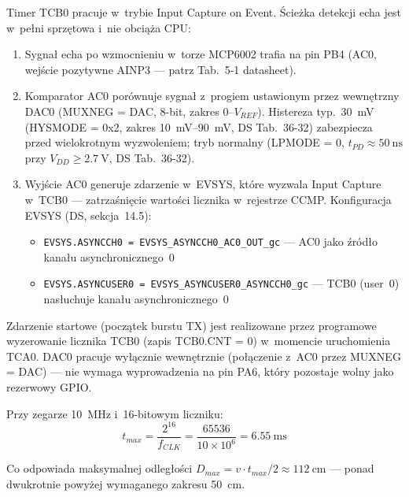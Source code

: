 \documentclass[a4paper,11pt]{article}
\begin{document}
Timer TCB0 pracuje w~trybie Input Capture on Event. Ścieżka detekcji
echa jest w~pełni sprzętowa i~nie obciąża CPU:

\begin{enumerate}[nosep]
    \item Sygnał echa po wzmocnieniu w~torze MCP6002 trafia
          na pin PB4 (AC0, wejście pozytywne AINP3 --- patrz Tab.~5-1 datasheet).
    \item Komparator AC0 porównuje sygnał z~progiem ustawionym przez
          wewnętrzny DAC0 (MUXNEG = DAC, 8-bit, zakres 0--$V_{REF}$).
          Histereza typ.\ \SI{30}{\milli\volt} (HYSMODE = 0x2,
          zakres \SIrange{10}{90}{\milli\volt}, DS Tab.~36-32) zabezpiecza
          przed wielokrotnym wyzwoleniem; tryb normalny (LPMODE = 0,
          $t_{PD} \approx \SI{50}{\nano\second}$ przy $V_{DD} \geq \SI{2,7}{\volt}$,
          DS Tab.~36-32).
    \item Wyjście AC0 generuje zdarzenie w~EVSYS, które
          wyzwala Input Capture w~TCB0 --- zatrzaśnięcie wartości licznika
          w~rejestrze CCMP. Konfiguracja EVSYS (DS, sekcja~14.5):
          \begin{itemize}[nosep]
              \item \texttt{EVSYS.ASYNCCH0 = EVSYS\_ASYNCCH0\_AC0\_OUT\_gc}
                    --- AC0 jako źródło kanału asynchronicznego~0
              \item \texttt{EVSYS.ASYNCUSER0 = EVSYS\_ASYNCUSER0\_ASYNCCH0\_gc}
                    --- TCB0 (user~0) nasłuchuje kanału asynchronicznego~0
          \end{itemize}
\end{enumerate}

Zdarzenie startowe (początek burstu TX) jest realizowane przez programowe
wyzerowanie licznika TCB0 (zapis TCB0.CNT = 0) w~momencie uruchomienia
TCA0. DAC0 pracuje wyłącznie wewnętrznie (połączenie z~AC0 przez
MUXNEG = DAC) --- nie wymaga wyprowadzenia na pin PA6, który pozostaje
wolny jako rezerwowy GPIO.

Przy zegarze \SI{10}{\mega\hertz} i~16-bitowym liczniku:
\begin{equation}
    t_{max} = \frac{2^{16}}{f_{CLK}} = \frac{65536}{10 \times 10^6} = \SI{6,55}{\milli\second}
    \label{eq:tcb_max}
\end{equation}

Co odpowiada maksymalnej odległości $D_{max} = v \cdot t_{max} / 2 \approx
\SI{112}{\centi\metre}$ --- ponad dwukrotnie powyżej wymaganego zakresu \SI{50}{\centi\metre}.
\end{document}
